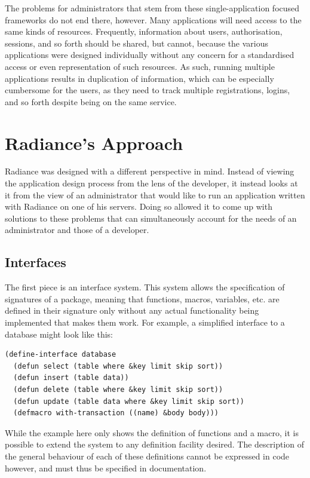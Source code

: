 \documentclass{sig-alternate}
\begin{document}
The problems for administrators that stem from these single-application focused frameworks do not end there, however. Many applications will need access to the same kinds of resources. Frequently, information about users, authorisation, sessions, and so forth should be shared, but cannot, because the various applications were designed individually without any concern for a standardised access or even representation of such resources. As such, running multiple applications results in duplication of information, which can be especially cumbersome for the users, as they need to track multiple registrations, logins, and so forth despite being on the same service. \\

\section{Radiance's Approach}
Radiance was designed with a different perspective in mind. Instead of viewing the application design process from the lens of the developer, it instead looks at it from the view of an administrator that would like to run an application written with Radiance on one of his servers. Doing so allowed it to come up with solutions to these problems that can simultaneously account for the needs of an administrator and those of a developer. \\

\subsection{Interfaces}
The first piece is an interface system. This system allows the specification of signatures of a package, meaning that functions, macros, variables, etc. are defined in their signature only without any actual functionality being implemented that makes them work. For example, a simplified interface to a database might look like this:

\begin{verbatim}
(define-interface database
  (defun select (table where &key limit skip sort))
  (defun insert (table data))
  (defun delete (table where &key limit skip sort))
  (defun update (table data where &key limit skip sort))
  (defmacro with-transaction ((name) &body body)))
\end{verbatim}

While the example here only shows the definition of functions and a macro, it is possible to extend the system to any definition facility desired. The description of the general behaviour of each of these definitions cannot be expressed in code however, and must thus be specified in documentation. \\
\end{document}

